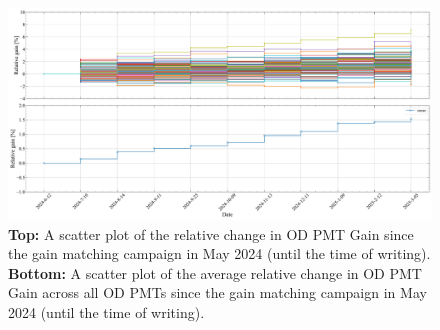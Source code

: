 \begin{figure}
    \centering
    \includegraphics[width=\textwidth]{figures/ODCommissioning/RelativegainOverTime_AllPMTs_Both_Full_WS2024May2024Onwards.pdf}
    \caption{\textbf{Top:} A scatter plot of the relative change in OD PMT Gain since the gain matching campaign in May 2024 (until the time of writing). \textbf{Bottom:} A scatter plot of the average relative change in OD PMT Gain across all OD PMTs since the gain matching campaign in May 2024 (until the time of writing).}
    \label{fig:ODCommissioning/RelativeGain_WS2024May2024Onwards}
\end{figure}

